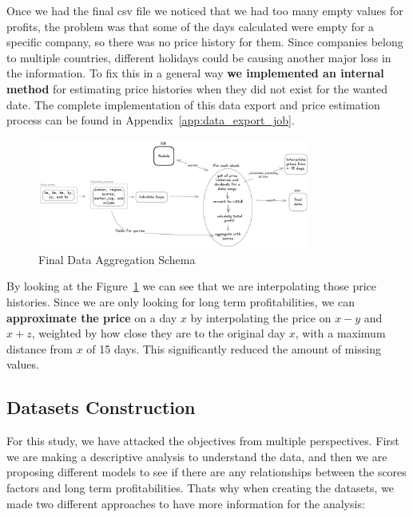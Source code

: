 \documentclass[11pt,english,a4paper,hidelinks]{book}
\begin{document}
\noindent Once we had the final csv file we noticed that we had too many empty values for profits, the problem was that some of the days calculated were empty for a specific company, so there was no price history for them. Since companies belong to multiple countries, different holidays could be causing another major loss in the information. To fix this in a general way \textbf{we implemented an internal method} for estimating price histories when they did not exist for the wanted date. The complete implementation of this data export and price estimation process can be found in Appendix~\ref{app:data_export_job}.

\begin{figure}[H]
    \centering
    \includegraphics[width=0.8\textwidth]{images/tweenvest/Final Data Aggregation Schema.png}
    \caption{Final Data Aggregation Schema}
    \label{fig:final_data_aggregation_schema}
\end{figure}

\noindent By looking at the Figure~\ref{fig:final_data_aggregation_schema} we can see that we are interpolating those price histories. Since we are only looking for long term profitabilities, we can \textbf{approximate the price} on a day $x$ by interpolating the price on $x-y$ and $x+z$, weighted by how close they are to the original day $x$, with a maximum distance from $x$ of 15 days. This significantly reduced the amount of missing values.

\subsection{Datasets Construction}

For this study, we have attacked the objectives from multiple perspectives. First we are making a descriptive analysis to understand the data, and then we are proposing different models to see if there are any relationships between the scores factors and long term profitabilities. Thats why when creating the datasets, we made two different approaches to have more information for the analysis:
\end{document}
